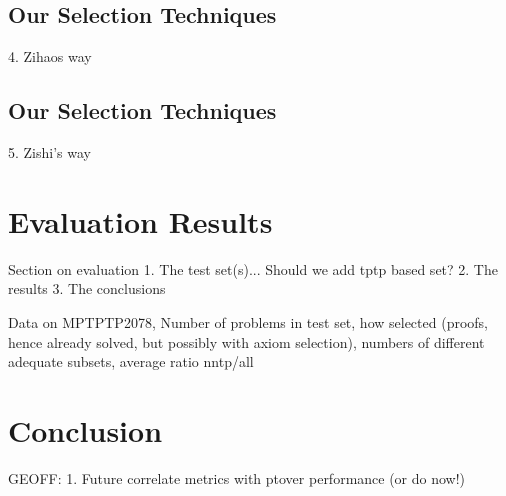 \documentclass[EPiC]{easychair}
\begin{document}
\subsection{Our Selection Techniques}
\label{Zihao}

4. Zihaos way
\subsection{Our Selection Techniques}
\label{Zishi}

5. Zishi's way
\section{Evaluation Results}
\label{Results}

Section on evaluation
1. The test set(s)... Should we add tptp based set?
2. The results
3. The conclusions

Data on MPTPTP2078, Number of problems in test set, how selected (proofs,
hence already solved, but possibly with axiom selection), numbers of
different adequate subsets, average ratio nntp/all

\section{Conclusion}
\label{Conclusion}

GEOFF:
1. Future correlate metrics with ptover performance (or do now!)

\label{sect:bib}


\end{document}
